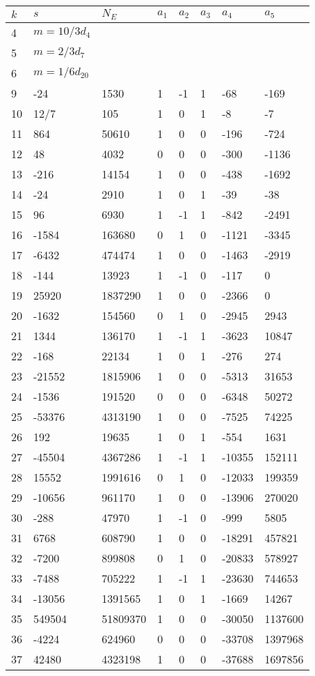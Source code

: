 \documentclass{amsart}
\begin{document}
\begin{longtable}{|l|l|l|lllll|}
\hline
$k$ & $s$ & $N_E$ & $a_1$ & $a_2$ & $a_3$ & $a_4$ & $a_5$\\
\hline
4&$m=10/3d_{4}$&&\multicolumn{5}{c|}{}\\
5&$m=2/3d_{7}$&&\multicolumn{5}{c|}{}\\
6&$m=1/6d_{20}$&&\multicolumn{5}{c|}{}\\
9&-24&1530&1&-1&1&-68&-169\\
10&12/7&105&1&0&1&-8&-7\\
11&864&50610&1&0&0&-196&-724\\
12&48&4032&0&0&0&-300&-1136\\
13&-216&14154&1&0&0&-438&-1692\\
14&-24&2910&1&0&1&-39&-38\\
15&96&6930&1&-1&1&-842&-2491\\
16&-1584&163680&0&1&0&-1121&-3345\\
17&-6432&474474&1&0&0&-1463&-2919\\
18&-144&13923&1&-1&0&-117&0\\
19&25920&1837290&1&0&0&-2366&0\\
20&-1632&154560&0&1&0&-2945&2943\\
21&1344&136170&1&-1&1&-3623&10847\\
22&-168&22134&1&0&1&-276&274\\
23&-21552&1815906&1&0&0&-5313&31653\\
24&-1536&191520&0&0&0&-6348&50272\\
25&-53376&4313190&1&0&0&-7525&74225\\
26&192&19635&1&0&1&-554&1631\\
27&-45504&4367286&1&-1&1&-10355&152111\\
28&15552&1991616&0&1&0&-12033&199359\\
29&-10656&961170&1&0&0&-13906&270020\\
30&-288&47970&1&-1&0&-999&5805\\
31&6768&608790&1&0&0&-18291&457821\\
32&-7200&899808&0&1&0&-20833&578927\\
33&-7488&705222&1&-1&1&-23630&744653\\
34&-13056&1391565&1&0&1&-1669&14267\\
35&549504&51809370&1&0&0&-30050&1137600\\
36&-4224&624960&0&0&0&-33708&1397968\\
37&42480&4323198&1&0&0&-37688&1697856\\

\end{longtable}
\end{document}
